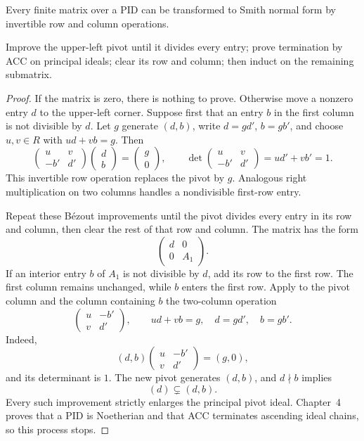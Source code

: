 \begin{proposition}
Every finite matrix over a PID can be transformed to Smith normal form by
invertible row and column operations.
\end{proposition}
\begin{proofidea}
Improve the upper-left pivot until it divides every entry; prove termination
by ACC on principal ideals; clear its row and column; then induct on the
remaining submatrix.
\end{proofidea}
\begin{proof}
If the matrix is zero, there is nothing to prove.  Otherwise move a nonzero
entry \(d\) to the upper-left corner.  Suppose first that an entry \(b\) in
the first column is not divisible by \(d\).  Let \(g\) generate \((d,b)\),
write \(d=gd'\), \(b=gb'\), and choose \(u,v\in R\) with \(ud+vb=g\).  Then
\[
\begin{pmatrix}u&v\\-b'&d'\end{pmatrix}
\begin{pmatrix}d\\b\end{pmatrix}
=\begin{pmatrix}g\\0\end{pmatrix},
\qquad
\det\begin{pmatrix}u&v\\-b'&d'\end{pmatrix}=ud'+vb'=1.
\]
This invertible row operation replaces the pivot by \(g\).  Analogous right
multiplication on two columns handles a nondivisible first-row entry.

Repeat these B\'ezout improvements until the pivot divides every entry in its
row and column, then clear the rest of that row and column.  The matrix has
the form
\[
\begin{pmatrix}d&0\\0&A_1\end{pmatrix}.
\]
If an interior entry \(b\) of \(A_1\) is not divisible by \(d\), add its row
to the first row.  The first column remains unchanged, while \(b\) enters the
first row.  Apply to the pivot column and the column containing \(b\) the
two-column operation
\[
\begin{pmatrix}u&-b'\\v&d'\end{pmatrix},
\qquad ud+vb=g,\quad d=gd',\quad b=gb'.
\]
Indeed,
\[
(d,b)\begin{pmatrix}u&-b'\\v&d'\end{pmatrix}=(g,0),
\]
and its determinant is \(1\).  The new pivot generates \((d,b)\), and
\(d\nmid b\) implies
\[
(d)\subsetneq(d,b).
\]
Every such improvement strictly enlarges the principal pivot ideal.
Chapter~4 proves that a PID is Noetherian and that ACC terminates ascending
ideal chains, so this process stops.


\end{proof}
